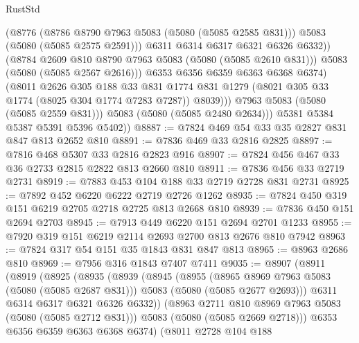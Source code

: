 \begin{lexlean}{RustStd}
\begin{coremodule}
{\begin{coremodule}
{{{{{                        (@8776
                          (@8786 @8790 @7963 @5083 (@5080 (@5085 @2585 @831)))
                          @5083
                          (@5080 (@5085 @2575 @2591)))
                        @6311
                        @6314
                        @6317
                        @6321
                        @6326
                        @6332))
                    (@8784 @2609 @810 @8790 @7963 @5083 (@5080 (@5085 @2610 @831)))
                    @5083
                    (@5080 (@5085 @2567 @2616)))
                  @6353
                  @6356
                  @6359
                  @6363
                  @6368
                  @6374)
                (@8011
                  @2626
                  @305
                  @188
                  @33
                  @831
                  @1774
                  @831
                  @1279
                  (@8021 @305 @33 @1774 (@8025 @304 @1774 @7283 @7287))
                  @8039)))
            @7963
            @5083
            (@5080 (@5085 @2559 @831)))
          @5083
          (@5080 (@5085 @2480 @2634)))
        @5381
        @5384
        @5387
        @5391
        @5396
        @5402))
@8887 := @7824 @469 @54 @33 @35 @2827 @831 @847 @813 @2652 @810
@8891 := @7836 @469 @33 @2816 @2825
@8897 := @7816 @468 @5307 @33 @2816 @2823 @916
@8907 := @7824 @456 @467 @33 @36 @2733 @2815 @2822 @813 @2660 @810
@8911 := @7836 @456 @33 @2719 @2731
@8919 := @7883 @453 @104 @188 @33 @2719 @2728 @831 @2731
@8925 := @7892 @452 @6220 @6222 @2719 @2726 @1262
@8935 := @7824 @450 @319 @151 @6219 @2705 @2718 @2725 @813 @2668 @810
@8939 := @7836 @450 @151 @2694 @2703
@8945 := @7913 @449 @6220 @151 @2694 @2701 @1233
@8955 := @7920 @319 @151 @6219 @2114 @2693 @2700 @813 @2676 @810 @7942
@8963 := @7824 @317 @54 @151 @35 @1843 @831 @847 @813
@8965 := @8963 @2686 @810
@8969 := @7956 @316 @1843 @7407 @7411
@9035 := @8907
    (@8911
      (@8919
        (@8925
          (@8935
            (@8939
              (@8945
                (@8955
                  (@8965 @8969 @7963 @5083 (@5080 (@5085 @2687 @831)))
                  @5083
                  (@5080 (@5085 @2677 @2693)))
                @6311
                @6314
                @6317
                @6321
                @6326
                @6332))
            (@8963 @2711 @810 @8969 @7963 @5083 (@5080 (@5085 @2712 @831)))
            @5083
            (@5080 (@5085 @2669 @2718)))
          @6353
          @6356
          @6359
          @6363
          @6368
          @6374)
        (@8011
          @2728
          @104
          @188
}}}}}
\end{coremodule}}
\end{coremodule}
\end{lexlean}
